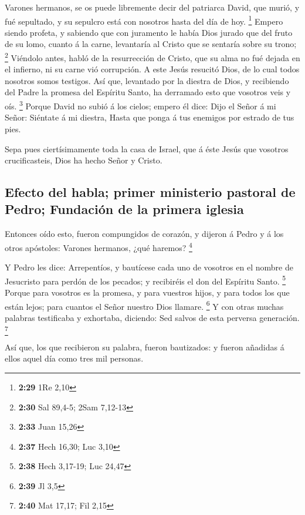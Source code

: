  Varones hermanos, se os puede libremente decir del
patriarca David, que murió, y fué sepultado, y su sepulcro está con
nosotros hasta del día de hoy. \footnote{\textbf{2:29} 1Re 2,10}
 Empero siendo profeta, y sabiendo que con juramento le
había Dios jurado que del fruto de su lomo, cuanto á la carne,
levantaría al Cristo que se sentaría sobre su trono; \footnote{\textbf{2:30}
  Sal 89,4-5; 2Sam 7,12-13}  Viéndolo antes, habló de la
resurrección de Cristo, que su alma no fué dejada en el infierno, ni su
carne vió corrupción.  A este Jesús resucitó Dios, de lo
cual todos nosotros somos testigos.  Así que, levantado por
la diestra de Dios, y recibiendo del Padre la promesa del Espíritu
Santo, ha derramado esto que vosotros veis y oís. \footnote{\textbf{2:33}
  Juan 15,26}  Porque David no subió á los cielos; empero
él dice: Dijo el Señor á mi Señor: Siéntate á mi diestra, 
Hasta que ponga á tus enemigos por estrado de tus pies.

 Sepa pues ciertísimamente toda la casa de Israel, que á
éste Jesús que vosotros crucificasteis, Dios ha hecho Señor y Cristo.

\hypertarget{efecto-del-habla-primer-ministerio-pastoral-de-pedro-fundaciuxf3n-de-la-primera-iglesia}{%
\subsection{Efecto del habla; primer ministerio pastoral de Pedro;
Fundación de la primera
iglesia}\label{efecto-del-habla-primer-ministerio-pastoral-de-pedro-fundaciuxf3n-de-la-primera-iglesia}}

 Entonces oído esto, fueron compungidos de corazón, y
dijeron á Pedro y á los otros apóstoles: Varones hermanos, ¿qué haremos?
\footnote{\textbf{2:37} Hech 16,30; Luc 3,10}

 Y Pedro les dice: Arrepentíos, y bautícese cada uno de
vosotros en el nombre de Jesucristo para perdón de los pecados; y
recibiréis el don del Espíritu Santo. \footnote{\textbf{2:38} Hech
  3,17-19; Luc 24,47}  Porque para vosotros es la promesa,
y para vuestros hijos, y para todos los que están lejos; para cuantos el
Señor nuestro Dios llamare. \footnote{\textbf{2:39} Jl 3,5}
 Y con otras muchas palabras testificaba y exhortaba,
diciendo: Sed salvos de esta perversa generación. \footnote{\textbf{2:40}
  Mat 17,17; Fil 2,15}

 Así que, los que recibieron su palabra, fueron bautizados:
y fueron añadidas á ellos aquel día como tres mil personas.

